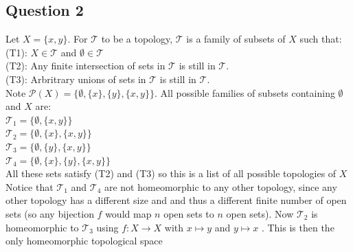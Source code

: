 \documentclass[letterpaper, 11pt]{article}
\newcommand{\1}{\mathds{1}}	%
\theoremstyle{definition}
\newcommand{\Tau}{\mathcal{T}}
\newcommand{\PSet}{\mathcal{P}}
\begin{document}
\subsection*{Question 2}
Let $X=\{x,y\}$. For $\Tau$ to be a topology, $\Tau$ is a family of subsets of $X$ such that: \\ (T1): $X \in \Tau$ and $\emptyset \in \Tau$ \\ (T2): Any finite intersection of sets in $\Tau$ is still in $\Tau$. \\ (T3): Arbritrary unions of sets in $\Tau$ is still in $\Tau$. \\ Note $\PSet(X) = \{\emptyset, \{x\}, \{y\}, \{x,y\}\}$. All possible families of subsets containing $\emptyset$ and $X$ are: \\
$\Tau _1 = \{\emptyset, \{x,y\}\}$ \\
$\Tau _2 = \{\emptyset, \{x\}, \{x,y\}\}$ \\
$\Tau _3 = \{\emptyset, \{y\}, \{x,y\}\}$ \\ 
$\Tau _4 = \{\emptyset, \{x\}, \{y\}, \{x,y\}\}$ \\ All these sets satisfy (T2) and (T3) so this is a list of all possible topologies of $X$ \\  Notice that $\Tau _1$ and $\Tau _4$ are not homeomorphic to any other topology, since any other topology has a different size and and thus a different finite number of open sets (so any bijection $f$ would map $n$ open sets to $n$ open sets).  Now $\Tau _2$ is homeomorphic to $\Tau _3$ using $f : X \to X$ with $x \mapsto y$ and $y \mapsto x$ . This is then the only homeomorphic topological space
\end{document}
